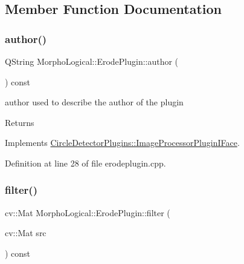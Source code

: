 \subsection{Member Function Documentation}
\mbox{\label{class_morpho_logical_1_1_erode_plugin_a5cd6e9ed96ec99a9586952e70f2a43b5}} 
\subsubsection{\texorpdfstring{author()}{author()}}
{\footnotesize\ttfamily Q\+String Morpho\+Logical\+::\+Erode\+Plugin\+::author (\begin{DoxyParamCaption}{ }\end{DoxyParamCaption}) const\hspace{0.3cm}{\ttfamily [virtual]}}



author used to describe the author of the plugin 

\begin{DoxyReturn}{Returns}

\end{DoxyReturn}


Implements \hyperlink{class_circle_detector_plugins_1_1_image_processor_plugin_i_face_a74b5e4f7aa50140ecc4a94587fb3ed42}{Circle\+Detector\+Plugins\+::\+Image\+Processor\+Plugin\+I\+Face}.



Definition at line 28 of file erodeplugin.\+cpp.

\mbox{\label{class_morpho_logical_1_1_erode_plugin_adaf5cef6022e87b1facd95063c92a2dc}} 
\subsubsection{\texorpdfstring{filter()}{filter()}}
{\footnotesize\ttfamily cv\+::\+Mat Morpho\+Logical\+::\+Erode\+Plugin\+::filter (\begin{DoxyParamCaption}\item[{cv\+::\+Mat}]{src }\end{DoxyParamCaption}) const\hspace{0.3cm}{\ttfamily [virtual]}}



